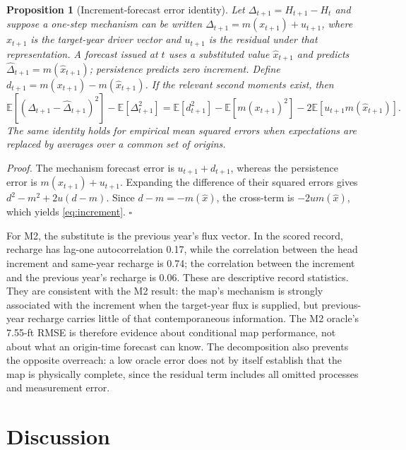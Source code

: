 \documentclass[11pt]{article}
\newtheorem{proposition}{Proposition}
\begin{document}
\begin{proposition}[Increment-forecast error identity]\label{prop:increment}
Let \(\Delta_{t+1}=H_{t+1}-H_t\) and suppose a one-step mechanism can be written \(\Delta_{t+1}=m(x_{t+1})+u_{t+1}\), where \(x_{t+1}\) is the target-year driver vector and \(u_{t+1}\) is the residual under that representation. A forecast issued at \(t\) uses a substituted value \(\widehat x_{t+1}\) and predicts \(\widehat\Delta_{t+1}=m(\widehat x_{t+1})\); persistence predicts zero increment. Define \(d_{t+1}=m(x_{t+1})-m(\widehat x_{t+1})\). If the relevant second moments exist, then
\begin{equation}\label{eq:increment}
\mathbb{E}\left[(\Delta_{t+1}-\widehat\Delta_{t+1})^2\right]-\mathbb{E}\left[\Delta_{t+1}^2\right]
=\mathbb{E}[d_{t+1}^2]-\mathbb{E}[m(x_{t+1})^2]-2\mathbb{E}\left[u_{t+1}m(\widehat x_{t+1})\right].
\end{equation}
The same identity holds for empirical mean squared errors when expectations are replaced by averages over a common set of origins.
\end{proposition}

\emph{Proof.} The mechanism forecast error is \(u_{t+1}+d_{t+1}\), whereas the persistence error is \(m(x_{t+1})+u_{t+1}\). Expanding the difference of their squared errors gives \(d^2-m^2+2u(d-m)\). Since \(d-m=-m(\widehat x)\), the cross-term is \(-2u m(\widehat x)\), which yields \eqref{eq:increment}. \(\square\)

For M2, the substitute is the previous year's flux vector. In the scored record, recharge has lag-one autocorrelation 0.17, while the correlation between the head increment and same-year recharge is 0.74; the correlation between the increment and the previous year's recharge is 0.06. These are descriptive record statistics. They are consistent with the M2 result: the map's mechanism is strongly associated with the increment when the target-year flux is supplied, but previous-year recharge carries little of that contemporaneous information. The M2 oracle's 7.55-ft RMSE is therefore evidence about conditional map performance, not about what an origin-time forecast can know. The decomposition also prevents the opposite overreach: a low oracle error does not by itself establish that the map is physically complete, since the residual term includes all omitted processes and measurement error.

\section{Discussion}
\end{document}
